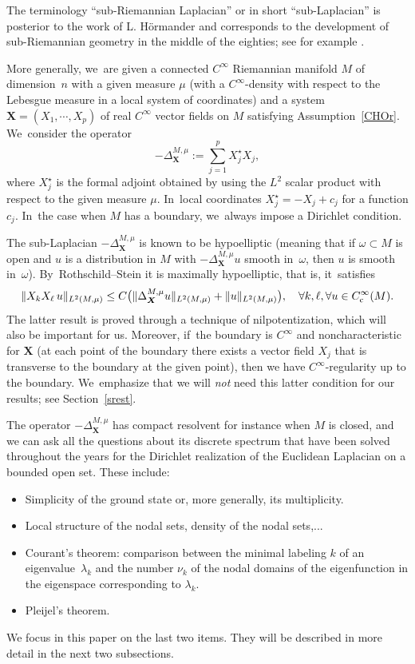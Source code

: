 \documentclass[JEP,XML,SOM,Unicode,published]{cedram}
\newcommand{\rc}{\textup{c}}
\newcommand{\bX}{{\boldsymbol{X}}}
\theoremstyle{definition}
\newcommand{\1}{\mathbbm{1}}
\begin{document}
The terminology ``sub-Riemannian Laplacian'' or in short ``sub-Laplacian'' is posterior to the work of L. Hörmander and corresponds to the development of sub-Riemannian geometry in the middle of the eighties; see for example \cite{AgBaBo,BeRi,Je,Str2}.

More generally, we~are given a connected $C^\infty$ Riemannian manifold $M$ of dimension~$n$ with a given measure $\mu$ (with a $C^\infty$-density with respect to the Lebesgue measure in a local system of coordinates) and a system $\bX= (X_1,\cdots,X_p)$ of real $C^\infty$ vector fields on $M$ satisfying Assumption~\ref{CHOr}. We~consider the operator
\[
-\Delta_\bX^{M,\mu} :=\sum_{j=1}^p X_j^\star X_j,
\]
where $X_j^\star$ is the formal adjoint obtained by using the $L^2$ scalar product with respect to the given measure $\mu$. In~local coordinates $X_j^\star =- X_j +c_j$ for a function $c_j$. In~the case when $M$ has a boundary, we~always impose a Dirichlet condition.

The sub-Laplacian $-\Delta_\bX^{M,\mu}$ is known to be hypoelliptic \cite{Ho} (meaning that if $\omega\subset M$ is open and $u$ is a distribution in $M$ with $-\Delta_\bX^{M,\mu} u$ smooth in~$\omega$, then $u$ is smooth in~$\omega$). By~Rothschild--Stein \cite{RS} it is maximally hypoelliptic, that is, it~satisfies
\[
\| X_k X_\ell \,u \|_{L^2(M,\mu)} \leq C \bigl(\|\Delta_\bX^{M,\mu} u \|_{L^2(M,\mu)} + \|u\|_{L^2(M,\mu)} \bigr), \quad \forall k,\ell, \forall u \in C_\rc^\infty(M).
\]
The latter result is proved through a technique of nilpotentization, which will also be important for us. Moreover, if~the boundary is $C^\infty$ and noncharacteristic for $\bX$ (\ie at each point of the boundary there exists a vector field $ X_j$ that is transverse to the boundary at the given point), then we have $C^\infty$-regularity up to the boundary. We~emphasize that we will \emph{not} need this latter condition for our results; see Section~\ref{srest}.

The operator $-\Delta_\bX^{M,\mu}$ has compact resolvent for instance when $M$ is closed, and we can ask all the questions about its discrete spectrum that have been solved throughout the years for the Dirichlet realization of the Euclidean Laplacian on a bounded open set. These include:
\begin{itemize}
\item Simplicity of the ground state or, more generally, its multiplicity.
\item Local structure of the nodal sets, density of the nodal sets,...
\item Courant's theorem: comparison between the minimal labeling $ k$ of an eigenvalue~$\lambda_k$ and the number $\nu_k$ of the nodal domains of the eigenfunction in the eigenspace corresponding to $\lambda_k$.
\item Pleijel's theorem.
\end{itemize}
We focus in this paper on the last two items. They will be described in more detail in the next two subsections.
\end{document}

